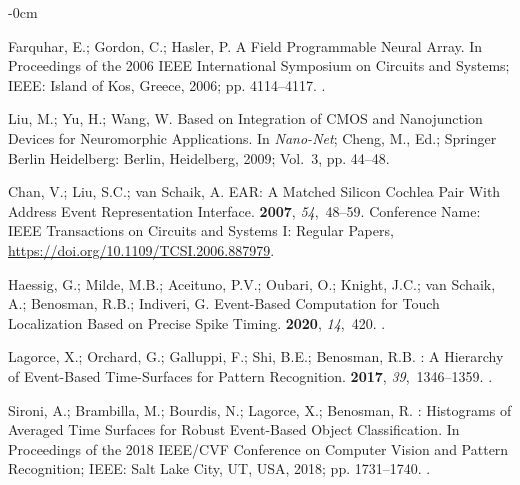\documentclass[brainsci, %
               review,submit,pdftex,moreauthors
               ]{Definitions/mdpi}
\begin{document}
\begin{adjustwidth}{-\extralength}{0cm}
\begin{thebibliography}{999}
  Farquhar, E.; Gordon, C.; Hasler, P.
  \newblock A {Field} {Programmable} {Neural} {Array}.
  \newblock In Proceedings of the 2006 {IEEE} {International} {Symposium} on
    {Circuits} and {Systems}; IEEE: Island of Kos, Greece,  2006; pp. 4114--4117.
  .
  
  Liu, M.; Yu, H.; Wang, W.
   {Based} on {Integration} of {CMOS} and {Nanojunction}
    {Devices} for {Neuromorphic} {Applications}. In {\em Nano-{Net}}; Cheng, M.,
    Ed.; Springer Berlin Heidelberg: Berlin, Heidelberg,  2009; Vol.~3, pp.
    44--48.
  
  Chan, V.; Liu, S.C.; van Schaik, A.
   {EAR}: {A} {Matched} {Silicon} {Cochlea} {Pair} {With}
    {Address} {Event} {Representation} {Interface}.
    {\bf 2007}, {\em 54},~48--59.
  \newblock Conference Name: IEEE Transactions on Circuits and Systems I: Regular
    Papers, {\url{https://doi.org/10.1109/TCSI.2006.887979}}.
  
  Haessig, G.; Milde, M.B.; Aceituno, P.V.; Oubari, O.; Knight, J.C.; van Schaik,
    A.; Benosman, R.B.; Indiveri, G.
  \newblock Event-{Based} {Computation} for {Touch} {Localization} {Based} on
    {Precise} {Spike} {Timing}.
   {\bf 2020}, {\em 14},~420.
  .
  
  Lagorce, X.; Orchard, G.; Galluppi, F.; Shi, B.E.; Benosman, R.B.
  : {A} {Hierarchy} of {Event}-{Based} {Time}-{Surfaces} for
    {Pattern} {Recognition}.
    {\bf 2017}, {\em 39},~1346--1359.
  .
  
  Sironi, A.; Brambilla, M.; Bourdis, N.; Lagorce, X.; Benosman, R.
  : {Histograms} of {Averaged} {Time} {Surfaces} for {Robust}
    {Event}-{Based} {Object} {Classification}.
  \newblock In Proceedings of the 2018 {IEEE}/{CVF} {Conference} on {Computer}
    {Vision} and {Pattern} {Recognition}; IEEE: Salt Lake City, UT, USA,  2018;
    pp. 1731--1740.
  .
  

\end{thebibliography}
\end{adjustwidth}
\end{document}
